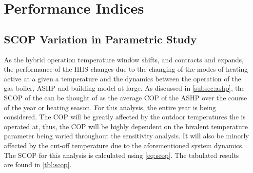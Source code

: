\begin{table}[htb]
    \footnotesize
    \centering
    \caption{Year-total energy consumption carpet plot for each parameter-level combination $\left[\unit{\kWh\per\year}\right]$}
    \label{tbl:totalconsump}
\end{table}


\section{Performance Indices}
\subsection{\acs{SCOP} Variation in Parametric Study}
As the hybrid operation temperature window shifts, and contracts and expands, the performance of the \ac{HHS} changes due to the changing of the modes of heating active at a given a temperature and the dynamics between the operation of the gas boiler, \ac{ASHP} and building model at large. As discussed in \cref{subsec:ashp}, the \ac{SCOP} of the \HP can be thought of as the average \ac{COP} of the \ac{ASHP} over the course of the year or heating season. For this analysis, the entire year is being considered. The \ac{COP} will be greatly affected by the outdoor temperatures the \HP is operated at, thus, the \ac{COP} will be highly dependent on the bivalent temperature parameter being varied throughout the sensitivity analysis. It will also be minorly affected by the cut-off temperature due to the aforementioned system dynamics. The \ac{SCOP} for this analysis is calculated using \cref{eq:scop}. The tabulated results are found in \cref{tbl:scop}.

